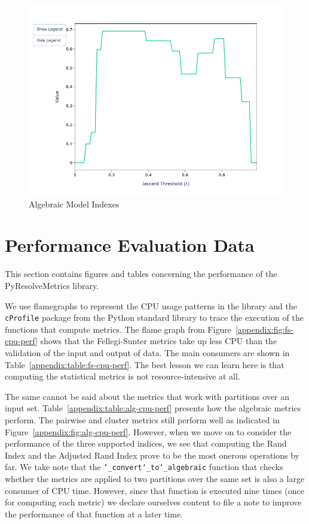 \documentclass{article}
\begin{document}
\begin{figure}[htbp]
\begin{minipage}{0.32\textwidth}
            \includegraphics[width=\textwidth]{sample-usage/mini-alg-ari}
        \end{minipage}
        \caption{Algebraic Model Indexes}\label{appendix:fig:alg-indexes}
    \end{figure}

    \section{Performance Evaluation Data}\label{appendix:sec:perf}
    This section contains figures and tables concerning the performance of the
    PyResolveMetrics library.

    We use flamegraphs\cite{flamegraphs2013} to represent the CPU usage
    patterns in the library and the \texttt{cProfile} package from the Python
    standard library to trace the execution of the functions that compute
    metrics.
    The flame graph from Figure~\ref{appendix:fig:fs-cpu-perf}
    shows that the Fellegi-Sunter metrics take up less CPU than the validation
    of the input and output of data. 
    The main consumers are shown in Table~\ref{appendix:table:fs-cpu-perf}.  
    The best lesson we can learn here is that computing the statistical metrics
    is not resource-intensive at all. 

    The same cannot be said about the metrics that work with partitions over an
    input set. 
    Table~\ref{appendix:table:alg-cpu-perf} presents how the algebraic metrics perform. 
    The pairwise and cluster metrics still perform well as indicated in
    Figure~\ref{appendix:fig:alg-cpu-perf}. 
    However, when we move on to consider the performance of the three supported
    indices, we see that computing the Rand Index and the Adjusted Rand Index
    prove to be the most onerous operations by far. 
    We take note that the \texttt{\char`_convert\char`_to\char`_algebraic}
    function that checks whether the metrics are applied to two partitions over
    the same set is also a large consumer of CPU time.
    However, since that function is executed nine times (once for computing each
    metric) we declare ourselves content to file a note to improve the
    performance of that function at a later time.
\end{document}
